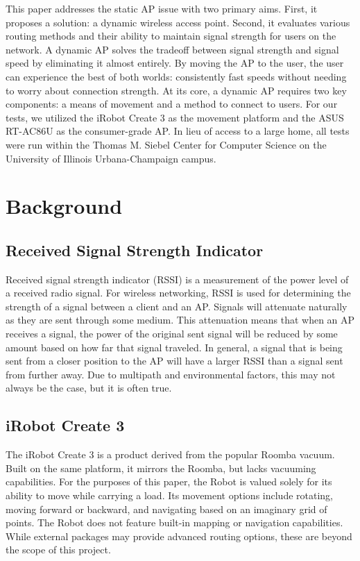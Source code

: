 This paper addresses the static AP issue with two primary aims. First, it proposes a solution: a dynamic wireless access point. Second, it evaluates various routing methods and their ability to maintain signal strength for users on the network. A dynamic AP solves the tradeoff between signal strength and signal speed by eliminating it almost entirely. By moving the AP to the user, the user can experience the best of both worlds: consistently fast speeds without needing to worry about connection strength. At its core, a dynamic AP requires two key components: a means of movement and a method to connect to users. For our tests, we utilized the iRobot Create 3 as the movement platform and the ASUS RT-AC86U as the consumer-grade AP. In lieu of access to a large home, all tests were run within the Thomas M. Siebel Center for Computer Science on the University of Illinois Urbana-Champaign campus. 

\section{Background}
\subsection{Received Signal Strength Indicator}
Received signal strength indicator (RSSI) is a measurement of the power level of a received radio signal. For wireless networking, RSSI is used for determining the strength of a signal between a client and an AP. Signals will attenuate naturally as they are sent through some medium. This attenuation means that when an AP receives a signal, the power of the original sent signal will be reduced by some amount based on how far that signal traveled. In general, a signal that is being sent from a closer position to the AP will have a larger RSSI than a signal sent from further away. Due to multipath and environmental factors, this may not always be the case, but it is often true.

\subsection{iRobot Create 3}
The iRobot Create 3 is a product derived from the popular Roomba vacuum. Built on the same platform, it mirrors the Roomba, but lacks vacuuming capabilities. For the purposes of this paper, the Robot is valued solely for its ability to move while carrying a load. Its movement options include rotating, moving forward or backward, and navigating based on an imaginary grid of points. The Robot does not feature built-in mapping or navigation capabilities. While external packages may provide advanced routing options, these are beyond the scope of this project.

